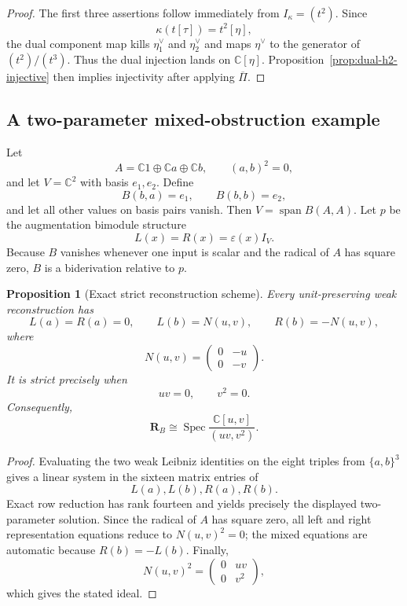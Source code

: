 \documentclass[11pt]{amsart}
\newtheorem{proposition}[theorem]{Proposition}
\newcommand{\Span}{\operatorname{span}}
\newcommand{\Spec}{\operatorname{Spec}}
\newcommand{\C}{\mathbb C}
\begin{document}
\begin{proof}
The first three assertions follow immediately from $I_\kappa=(t^2)$.  Since
\[
\kappa(t[\tau])=t^2[\eta],
\]
the dual component map kills $\eta_1^\vee$ and $\eta_2^\vee$ and maps $\eta^\vee$ to the generator of $(t^2)/(t^3)$.  Thus the dual injection lands on $\C[\eta]$.  Proposition~\ref{prop:dual-h2-injective} then implies injectivity after applying $\overline\Pi$.
\end{proof}

\subsection{A two-parameter mixed-obstruction example}\label{sec:two-parameter-example}

Let
\[
A=\C1\oplus\C a\oplus\C b,
\qquad
(a,b)^2=0,
\]
and let $V=\C^2$ with basis $e_1,e_2$.  Define
\[
B(b,a)=e_1,
\qquad
B(b,b)=e_2,
\]
and let all other values on basis pairs vanish.  Then $V=\Span B(A,A)$.  Let $p$ be the augmentation bimodule structure
\[
L(x)=R(x)=\varepsilon(x)I_V.
\]
Because $B$ vanishes whenever one input is scalar and the radical of $A$ has square zero, $B$ is a biderivation relative to $p$.

\begin{proposition}[Exact strict reconstruction scheme]\label{prop:two-parameter-scheme}
Every unit-preserving weak reconstruction has
\[
L(a)=R(a)=0,
\qquad
L(b)=N(u,v),
\qquad
R(b)=-N(u,v),
\]
where
\[
N(u,v)=
\begin{pmatrix}
0&-u\\
0&-v
\end{pmatrix}.
\]
It is strict precisely when
\[
uv=0,
\qquad
v^2=0.
\]
Consequently,
\[
\boxed{
\mathbf R_B
\cong
\Spec\frac{\C[u,v]}{(uv,v^2)}.
}
\]
\end{proposition}

\begin{proof}
Evaluating the two weak Leibniz identities on the eight triples from $\{a,b\}^3$ gives a linear system in the sixteen matrix entries of
\[
L(a),L(b),R(a),R(b).
\]
Exact row reduction has rank fourteen and yields precisely the displayed two-parameter solution.  Since the radical of $A$ has square zero, all left and right representation equations reduce to $N(u,v)^2=0$; the mixed equations are automatic because $R(b)=-L(b)$.  Finally,
\[
N(u,v)^2
=
\begin{pmatrix}
0&uv\\
0&v^2
\end{pmatrix},
\]
which gives the stated ideal.
\end{proof}
\end{document}
